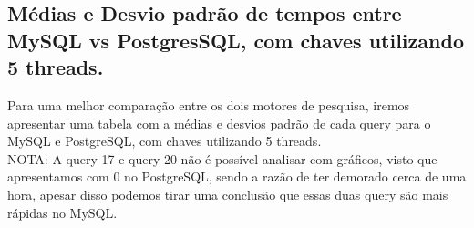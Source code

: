 \documentclass{article}
\begin{document}
  \subsection{Médias e Desvio padrão de tempos entre MySQL vs PostgresSQL, com chaves utilizando 5 threads.}

  \texttt{}\par Para uma melhor comparação entre os dois motores de pesquisa, iremos apresentar uma tabela com a médias e desvios padrão de cada query para o MySQL e PostgreSQL, com chaves utilizando 5 threads. \\
NOTA: A query 17 e query 20 não é possível analisar com gráficos, visto que apresentamos com 0 no PostgreSQL, sendo a razão de ter demorado cerca de uma hora, apesar disso podemos tirar uma conclusão que essas duas query são mais rápidas no MySQL.
\end{document}
